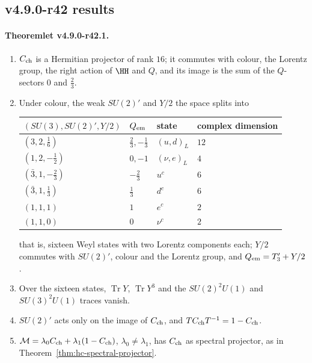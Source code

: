 \subsection*{v4.9.0-r42 results}
\label{subsec:v490-r42-results}

\paragraph{Theoremlet v4.9.0-r42.1.}
\begin{enumerate}[leftmargin=2em]
\item[(a)] \(C_{\rm ch}\) is a Hermitian projector of rank \(16\); it commutes with colour, the Lorentz group, the right action of \(\HH\)
and \(Q\), and its image is the sum of the \(Q\)-sectors \(0\) and \(\tfrac23\).
\item[(b)] Under colour, the weak \(SU(2)'\) and \(Y/2\) the space splits into
\begin{center}
\small
\begin{tabular}{@{}llll@{}}
\toprule
\((SU(3),SU(2)',Y/2)\) & \(Q_{\rm em}\) & state & complex dimension\\
\midrule
\((3,2,\tfrac16)\) & \(\tfrac23,-\tfrac13\) & \((u,d)_L\) & \(12\)\\
\((1,2,-\tfrac12)\) & \(0,-1\) & \((\nu,e)_L\) & \(4\)\\
\((\bar3,1,-\tfrac23)\) & \(-\tfrac23\) & \(u^c\) & \(6\)\\
\((\bar3,1,\tfrac13)\) & \(\tfrac13\) & \(d^c\) & \(6\)\\
\((1,1,1)\) & \(1\) & \(e^c\) & \(2\)\\
\((1,1,0)\) & \(0\) & \(\nu^c\) & \(2\)\\
\bottomrule
\end{tabular}
\end{center}
that is, sixteen Weyl states with two Lorentz components each; \(Y/2\) commutes with \(SU(2)'\), colour and the Lorentz group, and
\(Q_{\rm em}=T_3'+Y/2\).
\item[(c)] Over the sixteen states, \(\operatorname{Tr}Y\), \(\operatorname{Tr}Y^3\) and the \(SU(2)^2U(1)\) and \(SU(3)^2U(1)\) traces vanish.
\item[(d)] \(SU(2)'\) acts only on the image of \(C_{\rm ch}\), and \(TC_{\rm ch}T^{-1}=1-C_{\rm ch}\).
\item[(e)] \(\mathcal M=\lambda_0C_{\rm ch}+\lambda_1(1-C_{\rm ch})\), \(\lambda_0\neq\lambda_1\), has \(C_{\rm ch}\) as spectral projector, as in
Theorem~\ref{thm:hc-spectral-projector}.
\end{enumerate}

